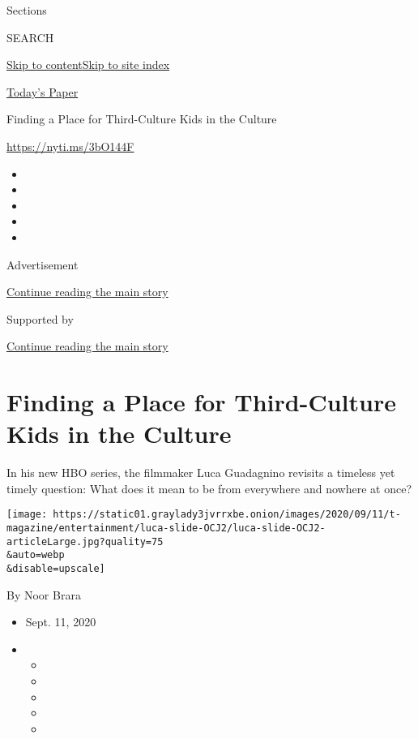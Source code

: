 Sections

SEARCH

\protect\hyperlink{site-content}{Skip to
content}\protect\hyperlink{site-index}{Skip to site index}

\href{https://myaccount.nytimes3xbfgragh.onion/auth/login?response_type=cookie\&client_id=vi}{}

\href{https://www.nytimes3xbfgragh.onion/section/todayspaper}{Today's
Paper}

Finding a Place for Third-Culture Kids in the Culture

\url{https://nyti.ms/3bO144F}

\begin{itemize}
\item
\item
\item
\item
\item
\end{itemize}

Advertisement

\protect\hyperlink{after-top}{Continue reading the main story}

Supported by

\protect\hyperlink{after-sponsor}{Continue reading the main story}

\hypertarget{finding-a-place-for-third-culture-kids-in-the-culture}{%
\section{Finding a Place for Third-Culture Kids in the
Culture}\label{finding-a-place-for-third-culture-kids-in-the-culture}}

In his new HBO series, the filmmaker Luca Guadagnino revisits a timeless
yet timely question: What does it mean to be from everywhere and nowhere
at once?

\texttt{[image: https://static01.graylady3jvrrxbe.onion/images/2020/09/11/t-magazine/entertainment/luca-slide-OCJ2/luca-slide-OCJ2-articleLarge.jpg?quality=75\\\&auto=webp\\\&disable=upscale]}

By Noor Brara

\begin{itemize}
\item
  Sept. 11, 2020
\item
  \begin{itemize}
  \item
  \item
  \item
  \item
  \item
  \end{itemize}
\end{itemize}

